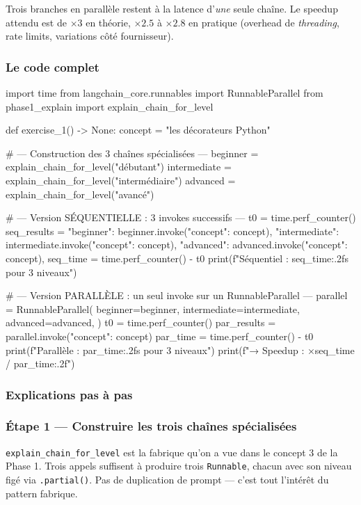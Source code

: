 \documentclass[11pt,a4paper]{article}
\begin{document}
Trois branches en parallèle restent à la latence d'\emph{une} seule chaîne.
Le speedup attendu est de $\times 3$ en théorie, $\times 2.5$ à $\times 2.8$
en pratique (overhead de \emph{threading}, rate limits, variations côté
fournisseur).

\subsubsection{Le code complet}

\begin{pythoncode}
import time
from langchain_core.runnables import RunnableParallel
from phase1_explain import explain_chain_for_level


def exercise_1() -> None:
    concept = "les décorateurs Python"

    # --- Construction des 3 chaînes spécialisées ---
    beginner     = explain_chain_for_level("débutant")
    intermediate = explain_chain_for_level("intermédiaire")
    advanced     = explain_chain_for_level("avancé")

    # --- Version SÉQUENTIELLE : 3 invokes successifs ---
    t0 = time.perf_counter()
    seq_results = {
        "beginner":     beginner.invoke({"concept": concept}),
        "intermediate": intermediate.invoke({"concept": concept}),
        "advanced":     advanced.invoke({"concept": concept}),
    }
    seq_time = time.perf_counter() - t0
    print(f"Séquentiel : {seq_time:.2f}s pour 3 niveaux")

    # --- Version PARALLÈLE : un seul invoke sur un RunnableParallel ---
    parallel = RunnableParallel(
        beginner=beginner,
        intermediate=intermediate,
        advanced=advanced,
    )
    t0 = time.perf_counter()
    par_results = parallel.invoke({"concept": concept})
    par_time = time.perf_counter() - t0
    print(f"Parallèle  : {par_time:.2f}s pour 3 niveaux")
    print(f"→ Speedup  : ×{seq_time / par_time:.2f}")
\end{pythoncode}

\subsubsection{Explications pas à pas}

\subsubsection*{Étape 1 — Construire les trois chaînes spécialisées}

\texttt{explain\_chain\_for\_level} est la fabrique qu'on a vue dans le
concept 3 de la Phase 1. Trois appels suffisent à produire trois
\texttt{Runnable}, chacun avec son niveau figé via \texttt{.partial()}.
Pas de duplication de prompt — c'est tout l'intérêt du pattern fabrique.
\end{document}

